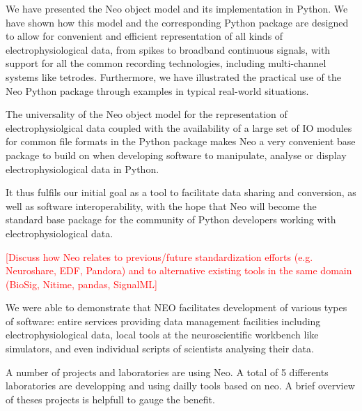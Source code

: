 \documentclass{frontiers}
\newcommand{\missing}[1]{\textcolor{red}{#1}}
\begin{document}
We have presented the Neo object model and its implementation in Python.
We have shown how this model and the corresponding Python package are designed to allow for convenient and efficient representation of all kinds of electrophysiological data, from spikes to broadband continuous signals, with support for all the common recording technologies, including multi-channel systems like tetrodes.
Furthermore, we have illustrated the practical use of the Neo Python package through examples in typical real-world situations.

The universality of the Neo object model for the representation of electrophysiolgical data coupled with the availability of a large set of IO modules for common file formats in the Python package makes Neo a very convenient base package to build on when developing software to manipulate, analyse or display electrophysiological data in Python.

It thus fulfils our initial goal as a tool to facilitate data sharing and conversion, as well as software interoperability, with the hope that Neo will become the standard base package for the community of Python developers working with electrophysiological data.

\missing{[Discuss how Neo relates to previous/future standardization efforts (e.g. Neuroshare, EDF, Pandora) and to alternative existing tools in the same domain (BioSig, Nitime, pandas, SignalML]}

  


We were able to demonstrate that NEO facilitates development of various types
of software: entire services providing data management facilities including
electrophysiological data, local tools at the neuroscientific workbench like
simulators, and even individual scripts of scientists analysing their data.

A number of projects and laboratories are using Neo. A total of 5 differents laboratories are developping and  using dailly tools based on neo. A brief overview of theses projects is helpfull to gauge the benefit.
\end{document}
